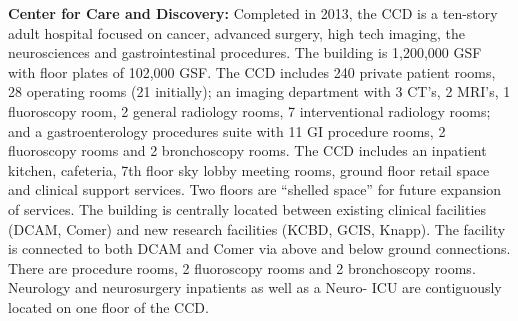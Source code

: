 \textbf{Center for Care and Discovery:} Completed in 2013, the CCD is a ten-story adult hospital focused on cancer, advanced surgery, high  tech  imaging,  the  neurosciences  and  gastrointestinal  procedures. The building is 1,200,000 GSF with floor plates of 102,000 GSF. The CCD includes 240 private patient rooms, 28 operating rooms (21 initially); an imaging department with 3 CT’s, 2 MRI’s, 1 fluoroscopy room, 2 general radiology rooms, 7 interventional radiology rooms; and a gastroenterology procedures suite with 11 GI procedure rooms, 2 fluoroscopy rooms and 2 bronchoscopy rooms.  The CCD includes an inpatient kitchen, cafeteria, 7th floor sky lobby meeting rooms, ground floor retail space and clinical support services. Two floors are “shelled space” for future expansion of services. The building is centrally located between existing clinical facilities (DCAM, Comer) and new research facilities (KCBD, GCIS, Knapp). The facility is connected to both DCAM and Comer via above and below ground connections. There are procedure rooms, 2 fluoroscopy rooms and 2 bronchoscopy rooms. Neurology and neurosurgery inpatients as well as a Neuro- ICU are contiguously located on one floor of the CCD. 


